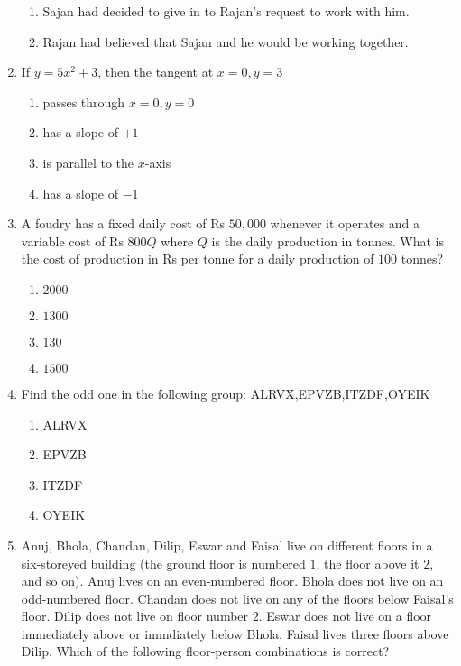 \documentclass[journal]{IEEEtran}
\begin{document}
\begin{enumerate}
{\begin{enumerate}
\item Sajan had decided to give in to Rajan's request to work with him.
\item Rajan had believed that Sajan and he would be working together.
\end{enumerate}
}
\item{
If $y=5x^2+3$, then the tangent at $x=0,y=3$ 
\begin{multicols}{2}
\begin{enumerate}
\item passes through $x=0,y=0$
\item has a slope of $+1$
\item is parallel to the $x$-axis
\item has a slope of $-1$
\end{enumerate}
\end{multicols}
}
\item{
A foudry has a fixed daily cost of Rs $50,000$ whenever it operates and a variable cost of Rs $800Q$ where $Q$ is the daily production in tonnes. What is the cost of production in Rs per tonne for a daily production of $100$ tonnes?
\begin{multicols}{4}
\begin{enumerate}
\item $2000$
\item $1300$
\item $130$
\item $1500$
\end{enumerate}
\end{multicols}
}
\item{
Find the odd one in the following group: ALRVX,EPVZB,ITZDF,OYEIK
\begin{multicols}{4}
\begin{enumerate}
\item ALRVX
\item EPVZB
\item ITZDF
\item OYEIK
\end{enumerate}
\end{multicols}
}
\item{
Anuj, Bhola, Chandan, Dilip, Eswar and Faisal live on different floors in a six-storeyed building (the ground floor is numbered $1$, the floor above it $2$, and so on). Anuj lives on an even-numbered floor. Bhola does not live on an odd-numbered floor. Chandan does not live on any of the floors below Faisal's floor. Dilip does not live on floor number $2$. Eswar does not live on a floor immediately above or immdiately below Bhola. Faisal lives three floors above Dilip. Which of the following floor-person combinations is correct?
}
\end{enumerate}
\end{document}
